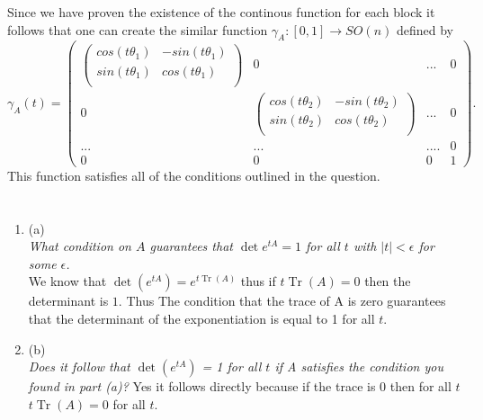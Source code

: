 \documentclass{article}
\begin{document}
    Since we have proven the existence of the continous function for each block it follows
    that one can create the similar function $\gamma_A : [0,1] \rightarrow SO(n)$ defined by
    \[
    \gamma_A(t) =
    \begin{pmatrix}
        \begin{pmatrix}
            cos(t \theta_1) & -sin(t \theta_1) \\
            sin(t \theta_1) & cos(t \theta_1 ) \\
        \end{pmatrix} & 0 & ... & 0\\
        0 & 
        \begin{pmatrix}
            cos(t \theta_2) & -sin(t \theta_2) \\
            sin(t \theta_2) & cos(t \theta_2 ) \\
        \end{pmatrix} & ... & 0\\ 
        ... & ... & .... & 0\\
        0 & 0 & 0 & 1

    \end{pmatrix} 
    .\] 
    This function satisfies all of the conditions outlined in the question.

    \section{}
    \begin{enumerate}
        \item (a)\\
            \emph{What condition on $A$ guarantees that  $\det e^{tA} = 1$ for all $t$ with $|t| < \epsilon $ for some $\epsilon $.}\\
            We know that $\det (e^{tA}) = e^{t\operatorname{Tr}(A)}$ thus if $t \operatorname{Tr}(A) = 0$ then the determinant is $1$. Thus
            The condition that the trace of A is zero guarantees that the determinant of the exponentiation is equal to 1 for all $t$.
        \item (b) \\
            \emph{Does it follow that $\det(e^{tA})$ = 1 for all $t$ if A satisfies the condition you found in part (a)?
            }
            Yes it follows directly because if the trace is 0 then for all  $t$ $t\operatorname{Tr}(A) = 0$ for all $t$.
    \end{enumerate}
\end{document}
